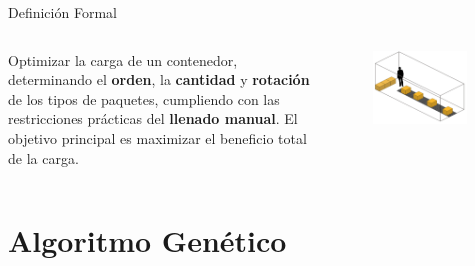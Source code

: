 \documentclass[handout]{beamer}
\begin{document}
\begin{frame}{Definición Formal}
    \begin{columns}
        \begin{column}{0.7\textwidth}
            \begin{center}
                Optimizar la carga de un contenedor, determinando el \textbf{\textcolor{ritsumeikan}{orden}}, la \textbf{\textcolor{ritsumeikan}{cantidad}} y  \textbf{\textcolor{ritsumeikan}{rotación}} de los tipos de paquetes, cumpliendo con las restricciones prácticas del \textbf{\textcolor{ritsumeikan}{llenado manual}}. El objetivo principal es maximizar el beneficio total de la carga.
            \end{center}
        \end{column}
        \begin{column}{0.4\textwidth}
            \begin{figure}
                \centering
                \includegraphics[width=0.95\textwidth]{pic/cinta-transportadora.png}
                \label{fig:cinta-transportadora}
            \end{figure}
        \end{column}
    \end{columns}

\end{frame}

\section{Algoritmo Genético}
\end{document}

